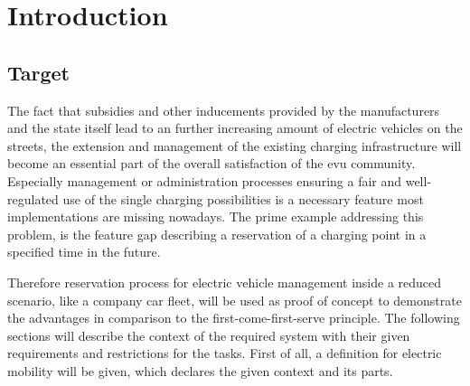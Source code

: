 
\chapter{Introduction}
\label{ch:Introduction}


\section{Target}
\label{ch:Introduction:sec:Target}

The fact that subsidies and other inducements provided by the manufacturers and the state itself lead to an further increasing amount of electric vehicles \cite{afshar_literature_2020} on the streets, the extension and management of the existing charging infrastructure will become an essential part of the overall satisfaction of the \acrfull{evu} community.
Especially management or administration processes ensuring a fair and well-regulated use of the single charging possibilities is a necessary feature most implementations are missing nowadays. 
The prime example addressing this problem, is the feature gap describing a reservation of a charging point in a specified time in the future. 

Therefore reservation process for electric vehicle management inside a reduced scenario, like a company car fleet, will be used as proof of concept to demonstrate the advantages in comparison to the first-come-first-serve principle. The following sections will describe the context of the required system with their given requirements and restrictions for the tasks. First of all, a definition for electric mobility will be given, which declares the given context and its parts.

